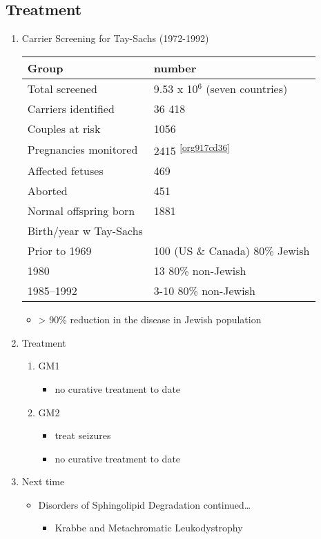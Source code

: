 \documentclass{scrartcl}
\begin{document}
\subsection{Treatment}
\label{sec:org4d24922}
\begin{enumerate}
\item Carrier Screening for Tay-Sachs (1972-1992)
\label{sec:org7579d4e}


\begin{center}
\begin{tabular}{ll}
Group & number\\
\hline
Total screened & 9.53 x 10\(^{\text{6}}\) (seven countries)\\
Carriers identified & 36 418\\
Couples at risk & 1056\\
Pregnancies monitored & 2415 \textsuperscript{\ref{org917cd36}}\\
Affected fetuses & 469\\
Aborted & 451\\
Normal offspring born & 1881\\
Birth/year w Tay-Sachs & \\
Prior to 1969 & 100 (US \& Canada) 80\% Jewish\\
1980 & 13 80\% non-Jewish\\
1985–1992 & 3-10 80\% non-Jewish\\
\end{tabular}
\end{center}

\begin{itemize}
\item > 90\% reduction in the disease in Jewish population
\end{itemize}

\item Treatment
\label{sec:org85da9a9}

\begin{enumerate}
\item GM1
\label{sec:org5773c53}
\begin{itemize}
\item no curative treatment to date
\end{itemize}
\item GM2
\label{sec:orga3503d8}
\begin{itemize}
\item treat seizures
\item no curative treatment to date
\end{itemize}
\end{enumerate}


\item Next time
\label{sec:org6bf7dde}

\begin{itemize}
\item Disorders of Sphingolipid Degradation continued\ldots{}
\begin{itemize}
\item Krabbe and Metachromatic Leukodystrophy
\end{itemize}
\end{itemize}
\end{enumerate}
\end{document}
